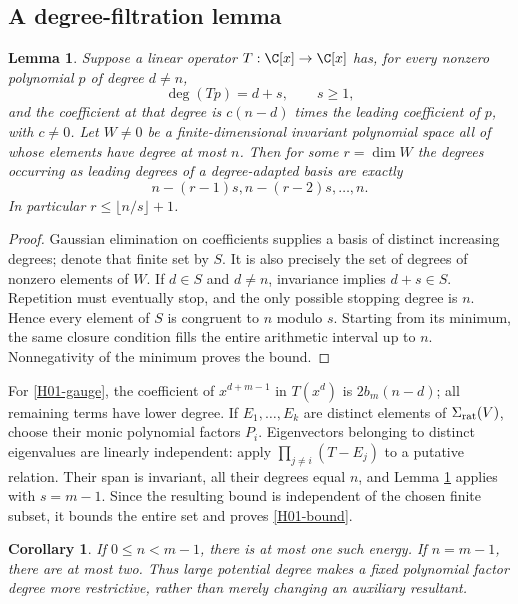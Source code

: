 \documentclass[11pt,a4paper]{article}
\newtheorem{lemma}[theorem]{Lemma}
\newtheorem{corollary}[theorem]{Corollary}
\theoremstyle{definition}\newtheorem{definition}[theorem]{Definition}
\theoremstyle{remark}\newtheorem{remark}[theorem]{Remark}
\numberwithin{equation}{section}
\begin{document}
\subsection{A degree-filtration lemma}\label{H01-sec-3}
\begin{lemma}\label{H01-ladder}
Suppose a linear operator $T:\C[x]\to\C[x]$ has, for every nonzero polynomial $p$ of degree $d\ne n$,
\[\deg(Tp)=d+s,\qquad s\ge1,\]
and the coefficient at that degree is $c(n-d)$ times the leading coefficient of $p$, with $c\ne0$. Let $W\ne0$ be a finite-dimensional invariant polynomial space all of whose elements have degree at most $n$. Then for some $r=\dim W$ the degrees occurring as leading degrees of a degree-adapted basis are exactly
\[n-(r-1)s,n-(r-2)s,\ldots,n.\]
In particular $r\le\lfloor n/s\rfloor+1$.
\end{lemma}
\begin{proof}
Gaussian elimination on coefficients supplies a basis of distinct increasing degrees; denote that finite set by $S$. It is also precisely the set of degrees of nonzero elements of $W$. If $d\in S$ and $d\ne n$, invariance implies $d+s\in S$. Repetition must eventually stop, and the only possible stopping degree is $n$. Hence every element of $S$ is congruent to $n$ modulo $s$. Starting from its minimum, the same closure condition fills the entire arithmetic interval up to $n$. Nonnegativity of the minimum proves the bound.
\end{proof}
For \eqref{H01-gauge}, the coefficient of $x^{d+m-1}$ in $T(x^d)$ is $2b_m(n-d)$; all remaining terms have lower degree. If $E_1,\ldots,E_k$ are distinct elements of $\Sigma_{\rm rat}(V)$, choose their monic polynomial factors $P_i$. Eigenvectors belonging to distinct eigenvalues are linearly independent: apply $\prod_{j\ne i}(T-E_j)$ to a putative relation. Their span is invariant, all their degrees equal $n$, and Lemma \ref{H01-ladder} applies with $s=m-1$. Since the resulting bound is independent of the chosen finite subset, it bounds the entire set and proves \eqref{H01-bound}.
\begin{corollary}
If $0\le n<m-1$, there is at most one such energy. If $n=m-1$, there are at most two. Thus large potential degree makes a fixed polynomial factor degree more restrictive, rather than merely changing an auxiliary resultant.
\end{corollary}
\end{document}
